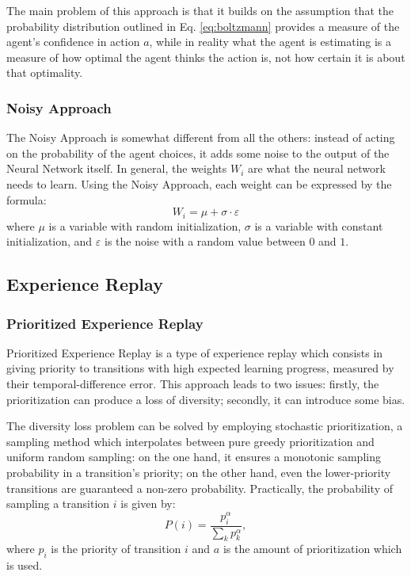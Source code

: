\documentclass[a4paper, 12pt]{article}
\numberwithin{equation}{section}
\begin{document}
The main problem of this approach is that it builds on the assumption that the probability distribution outlined in Eq. \eqref{eq:boltzmann} provides a measure of the agent's confidence in action $a$, while in reality what the agent is estimating is a measure of how optimal the agent thinks the action is, not how certain it is about that optimality.



\subsubsection{Noisy Approach}

The Noisy Approach \cite{deep-reinforcement} is somewhat different from all the others: instead of acting on the probability of the agent choices, it adds some noise to the output of the Neural Network itself. In general, the weights $W_i$ are what the neural network needs to learn. Using the Noisy Approach, each weight can be expressed by the formula:
\begin{equation}
	W_i = \mu+\sigma\cdot\varepsilon
\end{equation}
where $\mu$ is a variable with random initialization, $\sigma$ is a variable with constant initialization, and $\varepsilon$ is the noise with a random value between $0$ and $1$.


\subsection{Experience Replay}

\subsubsection{Prioritized Experience Replay}
Prioritized Experience Replay \cite{prioritized-experience-replay} is a type of experience replay which consists in giving priority to transitions with high expected learning progress, measured by their temporal-difference error. This approach leads to two issues: firstly, the prioritization can produce a loss of diversity; secondly, it can introduce some bias.

The diversity loss problem can be solved by employing stochastic prioritization, a sampling method which interpolates between pure greedy prioritization and uniform random sampling: on the one hand, it ensures a monotonic sampling probability in a transition's priority; on the other hand, even the lower-priority transitions are guaranteed a non-zero probability. Practically, the probability of sampling a transition $i$ is given by:
\begin{equation}
	P\left(i\right)=\frac{p_i^\alpha}{\sum_kp_k^\alpha},
\end{equation}
where $p_i$ is the priority of transition $i$ and $a$ is the amount of prioritization which is used.
\end{document}
